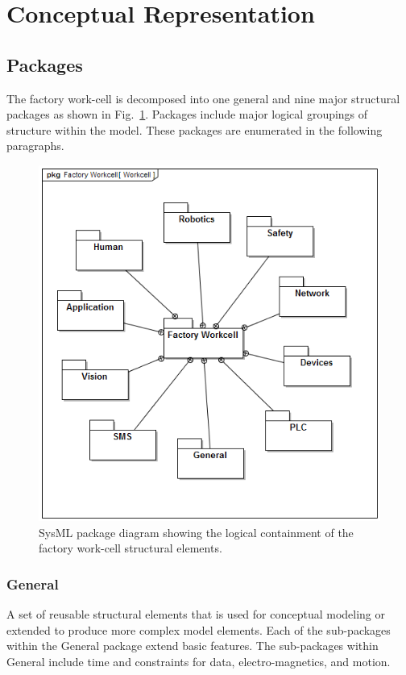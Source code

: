 \documentclass[journal, twoside]{IEEEtran}
\begin{document}
	\section{Conceptual Representation}\label{sec:conceptual}
	\subsection{Packages}
	The factory work-cell is decomposed into one general and nine major structural packages as shown in Fig.~\ref{fig:pdd-workcell}.  Packages include major logical groupings of structure within the model.  These packages are enumerated in the following paragraphs.
	
	\begin{figure}[t]
		\begin{center}
			\includegraphics[width=\columnwidth]{diagrams/pkg__Factory_Workcell__Workcell}%
			\caption{SysML package diagram showing the logical containment of the factory work-cell structural elements.}%
			\label{fig:pdd-workcell}
		\end{center}
	\end{figure}
	
	
	\subsubsection{General} A set of reusable structural elements that is used for conceptual modeling or extended to produce more complex model elements.  Each of the sub-packages within the General package extend basic features.  The sub-packages within General include time and constraints for data, electro-magnetics, and motion.
	
\end{document}
